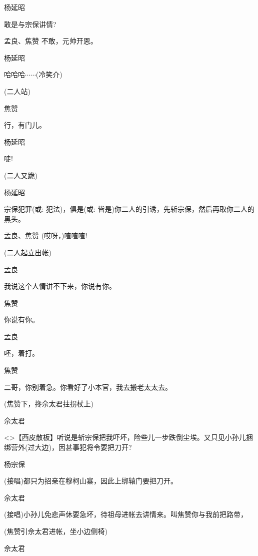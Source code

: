 {杨延昭\hspace{20pt}~

敢是与宗保讲情?

孟良、焦赞 不敢，元帅开恩。

杨延昭\hspace{20pt}~

哈哈哈$\cdots{}\cdots{}$(冷笑介)

(二人站)

焦赞\hspace{30pt}~

行，有门儿。

杨延昭\hspace{20pt}~

唗!

(二人又跪)

杨延昭

宗保犯罪({\akai 或}: 犯法)，俱是({\akai 或}: 皆是)你二人的引诱，先斩宗保，然后再取你二人的黑头。

孟良、焦赞 (哎呀，)喳喳喳!

(二人起立出帐)

孟良\hspace{30pt}~

我说这个人情讲不下来，你说有你。

焦赞\hspace{30pt}~

你说有你。

孟良\hspace{30pt}~

呸，着打。

焦赞\hspace{30pt}~

二哥，你别着急。你看好了小本官，我去搬老太太去。

(焦赞下，搀佘太君拄拐杖上)

佘太君

\textless{}\!\textgreater{}【{\akai 西皮散板}】听说是斩宗保把我吓坏，险些儿一步跌倒尘埃。又只见小孙儿捆绑营外(过大边)，因甚事犯将令要把刀开?

杨宗保\hspace{20pt}~

(接唱)都只为招亲在穆柯山寨，因此上绑辕门要把刀开。

佘太君

(接唱)小孙儿免悲声休要急坏，待祖母进帐去讲情来。叫焦赞你与我前把路带，

(焦赞引佘太君进帐，坐小边侧椅)

佘太君\hspace{20pt}~

}

